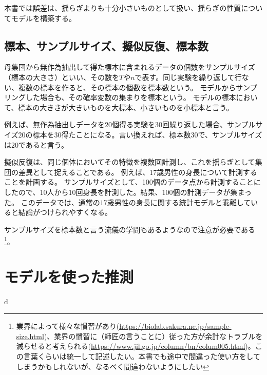 本書では誤差は、揺らぎよりも十分小さいものとして扱い、揺らぎの性質についてモデルを構築する。

\subsection{標本、サンプルサイズ、擬似反復、標本数}
\begin{defi}
母集団から無作為抽出して得た標本に含まれるデータの個数をサンプルサイズ（標本の大きさ）といい、その数を$T$や$n$で表す。同じ実験を繰り返して行ない、複数の標本を作ると、その標本の個数を標本数という。
モデルからサンプリングした場合も、その確率変数の集まりを標本という。
モデルの標本において、標本の大きさが大きいものを大標本、小さいものを小標本と言う。
\end{defi}
例えば、無作為抽出しデータを$20$個得る実験を30回繰り返した場合、サンプルサイズ$20$の標本を$30$得たことになる。言い換えれば、標本数$30$で、サンプルサイズは$20$であると言う。


擬似反復は、同じ個体においてその特徴を複数回計測し、これを揺らぎとして集団の差異として捉えることである。
例えば、17歳男性の身長について計測することを計画する。
サンプルサイズとして、100個のデータ点から計測することにしたので、$10$人から$10$回身長を計測した。結果、$100$個の計測データが集まった。
このデータでは、通常の$17$歳男性の身長に関する統計モデルと乖離していると結論がつけられやすくなる。



サンプルサイズを標本数と言う流儀の学問もあるようなので注意が必要である
\footnote{業界によって様々な慣習があり(\url{https://biolab.sakura.ne.jp/sample-size.html})、業界の慣習に（師匠の言うことに）従った方が余計なトラブルを減らせると考えられる(\url{https://www.jil.go.jp/column/bn/colum005.html})。この言葉くらいは統一して記述したい。本書でも途中で間違った使い方をしてしまうかもしれないが、なるべく間違わないようにしたい}。


\section{モデルを使った推測}
d

